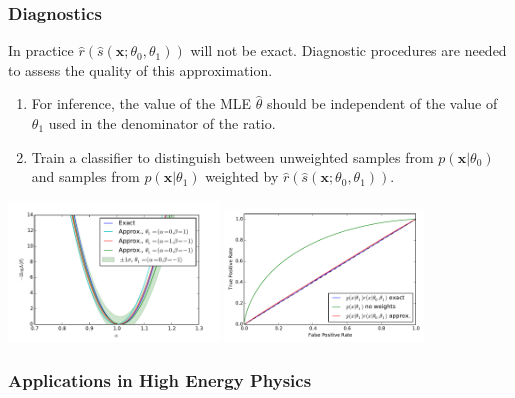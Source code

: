 \documentclass{beamer}
\begin{document}
\begin{frame}
    \frametitle{Diagnostics}

    In practice $\hat{r}(\hat{s}(\mathbf{x}; \theta_0, \theta_1))$ will not be exact.  Diagnostic procedures are needed to assess the quality of this approximation.

    \begin{enumerate}
        \item For inference, the value of the MLE $\hat{\theta}$ should be independent of the value of $\theta_1$ used in the denominator of the ratio.
        \item Train a classifier to distinguish between unweighted samples from $p(\mathbf{x}|\theta_0)$ and samples from $p(\mathbf{x}|\theta_1)$ weighted by $\hat{r}(\hat{s}(\mathbf{x}; \theta_0, \theta_1))$.
    \end{enumerate}

    \vspace{-2em}

    \begin{center}
            \includegraphics[clip, trim=0.3cm 0.3cm 0.3cm 0.3cm,height=10.075em]{figures/likelihood_comp_2.pdf}
            \includegraphics[clip, trim=0.3cm 0.3cm 0.3cm 0.3cm,height=9.5em]{figures/ROC_comp2.pdf}
    \end{center}

\end{frame}

\begin{frame}
    \frametitle{Applications in High Energy Physics}
\end{frame}
\end{document}
